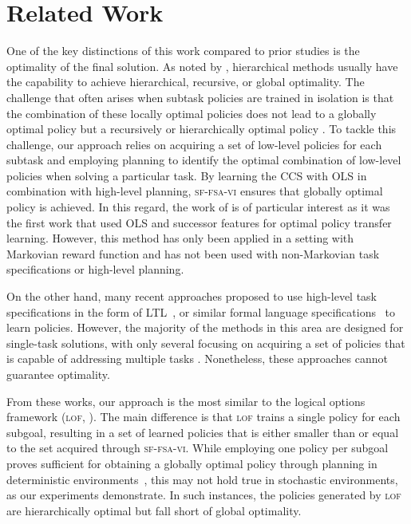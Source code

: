 \section{Related Work}
One of the key distinctions of this work compared to prior studies is the optimality of the final solution. As noted by \citep{Dietterich2000}, hierarchical methods usually have the capability to achieve hierarchical, recursive, or global optimality. The challenge that often arises when subtask policies are trained in isolation is that the combination of these locally optimal policies does not lead to a globally optimal policy but a recursively \citep{Dayan1992} or hierarchically optimal policy \citep{Sutton1999, Mann2015, Araki2021}.  To tackle this challenge, our approach relies on acquiring a set of low-level policies for each subtask and employing planning to identify the optimal combination of low-level policies when solving a particular task. By learning the CCS with OLS \citep{Roijers2014} in combination with high-level planning, \textsc{sf-fsa-vi} ensures that globally optimal policy is achieved. In this regard, the work of \citep{Alegre2022} is of particular interest as it was the first work that used OLS and successor features for optimal policy transfer learning. However, this method has only been applied in a setting with Markovian reward function and has not been used with non-Markovian task specifications or high-level planning. 

On the other hand, many recent approaches proposed to use high-level task specifications in the form of LTL~\citep{Icarte2018b, Kuo2020, Vaezipoor2021, Jothimurugan2021}, or similar formal language specifications~\citep{ToroIcarte2019,Camacho2019, Araki2021, Icarte2022} to learn policies. However, the majority of the methods in this area are designed for single-task solutions, with only several focusing on acquiring a set of policies that is capable of addressing multiple tasks \citep{Icarte2018b, Leon2020, Kuo2020, Araki2021, Vaezipoor2021}. Nonetheless, these approaches cannot guarantee optimality.

From these works, our approach is the most similar to the logical options framework (\textsc{lof}, \citet{Araki2021}). The main difference is that \textsc{lof} trains a single policy for each subgoal, resulting in a set of learned policies that is either smaller than or equal to the set acquired through \textsc{sf-fsa-vi}. While employing one policy per subgoal proves sufficient for obtaining a globally optimal policy through planning in deterministic environments~\citep{Wen2020}, this may not hold true in stochastic environments, as our experiments demonstrate. In such instances, the policies generated by \textsc{lof} are hierarchically optimal but fall short of global optimality.


